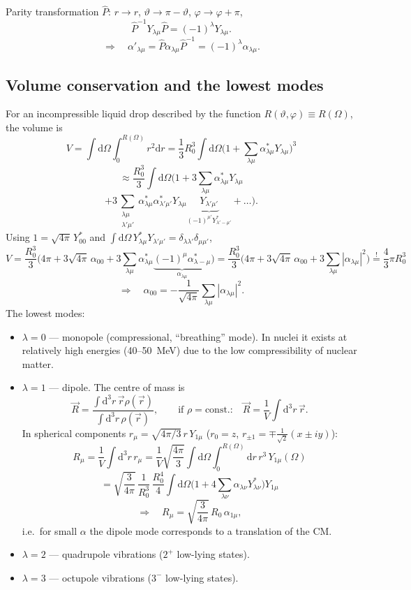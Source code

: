 \documentclass[11pt,a4paper]{article}
\newcommand{\op}[1]{\hat{#1}}
\newcommand{\ud}{\mathrm{d}}
\begin{document}
Parity transformation $\op P$: $r\to r$, $\vartheta\to\pi-\vartheta$, $\varphi\to\varphi+\pi$,
\[
\op P^{-1}Y_{\lambda\mu}\op P=(-1)^\lambda Y_{\lambda\mu}.
\]
\[
\Rightarrow\quad \alpha'_{\lambda\mu}=\op P\alpha_{\lambda\mu}\op P^{-1}=(-1)^\lambda\alpha_{\lambda\mu}.
\]

\subsection{Volume conservation and the lowest modes}
For an incompressible liquid drop described by the function $R(\vartheta,\varphi)\equiv R(\Omega)$, the volume is
\[
V=\int\ud\Omega\int_0^{R(\Omega)}r^2\ud r=\frac13R_0^3\int\ud\Omega\Big(1+\sum_{\lambda\mu}\alpha^*_{\lambda\mu}Y_{\lambda\mu}\Big)^3
\]
\[
\approx\frac{R_0^3}{3}\int\ud\Omega\Big(1+3\sum_{\lambda\mu}\alpha^*_{\lambda\mu}Y_{\lambda\mu}
\]
\[
+3\sum_{\substack{\lambda\mu\\\lambda'\mu'}}\alpha^*_{\lambda\mu}\alpha^*_{\lambda'\mu'}Y_{\lambda\mu}\underbrace{Y_{\lambda'\mu'}}_{(-1)^{\mu'}Y^*_{\lambda'-\mu'}}+\dots\Big).
\]
Using $1=\sqrt{4\pi}\,Y^*_{00}$ and $\int\ud\Omega\,Y^*_{\lambda\mu}Y_{\lambda'\mu'}=\delta_{\lambda\lambda'}\delta_{\mu\mu'}$,
\[
V=\frac{R_0^3}{3}\Big(4\pi+3\sqrt{4\pi}\,\alpha_{00}+3\sum_{\lambda\mu}\alpha^*_{\lambda\mu}\underbrace{(-1)^\mu\alpha^*_{\lambda-\mu}}_{\alpha_{\lambda\mu}}\Big)
=\frac{R_0^3}{3}\Big(4\pi+3\sqrt{4\pi}\,\alpha_{00}+3\sum_{\lambda\mu}|\alpha_{\lambda\mu}|^2\Big)\overset{!}{=}\frac43\pi R_0^3
\]
\[
\Rightarrow\quad \alpha_{00}=-\frac{1}{\sqrt{4\pi}}\sum_{\lambda\mu}|\alpha_{\lambda\mu}|^2 .
\]
The lowest modes:
\begin{itemize}
\item $\lambda=0$ --- monopole (compressional, ``breathing'' mode). In nuclei it exists at relatively high energies (40--50~MeV) due to the low compressibility of nuclear matter.
\item $\lambda=1$ --- dipole. The centre of mass is
\[
\vec R=\frac{\int\ud^3r\,\vec r\rho(\vec r)}{\int\ud^3r\,\rho(\vec r)},
\qquad\text{if }\rho=\text{const.:}\quad \vec R=\frac1V\int\ud^3r\,\vec r .
\]
In spherical components $r_\mu=\sqrt{4\pi/3}\,r\,Y_{1\mu}$ ($r_0=z$, $r_{\pm1}=\mp\frac{1}{\sqrt2}(x\pm iy)$):
\[
R_\mu=\frac1V\int\ud^3r\,r_\mu=\frac1V\sqrt{\frac{4\pi}{3}}\int\ud\Omega\int_0^{R(\Omega)}\ud r\,r^3\,Y_{1\mu}(\Omega)
\]
\[
=\sqrt{\frac{3}{4\pi}}\,\frac{1}{R_0^3}\,\frac{R_0^4}{4}\int\ud\Omega\Big(1+4\sum_{\lambda\nu}\alpha_{\lambda\nu}Y^*_{\lambda\nu}\Big)Y_{1\mu}
\]
\[
\Rightarrow\quad R_\mu=\sqrt{\frac{3}{4\pi}}\,R_0\,\alpha_{1\mu},
\]
i.e.\ for small $\alpha$ the dipole mode corresponds to a translation of the CM.
\item $\lambda=2$ --- quadrupole vibrations ($2^+$ low-lying states).
\item $\lambda=3$ --- octupole vibrations ($3^-$ low-lying states).
\end{itemize}
\end{document}

